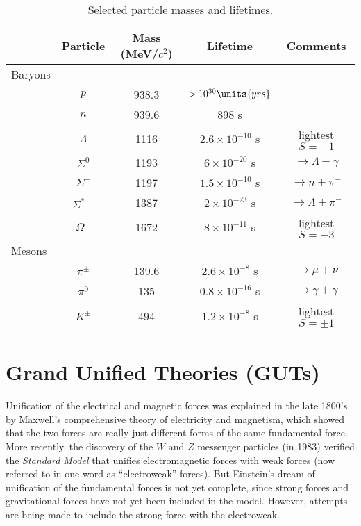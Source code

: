 \begin{table}[!b]
\caption{Selected particle masses and lifetimes.}
\label{table:mass_lifetimes}
\begin{center}
\begin{tabular}[tbp]{lcccc}
& Particle & Mass (MeV/$c^2$) & Lifetime & Comments \\
\hline\hline
Baryons & \\
& $p$ & 938.3 & $>10^{30}\units{yrs}$ & \\
& $n$ & 939.6 & 898 s & \\
& $\Lambda$ &  1116 & $2.6\times 10^{-10}$ s & lightest $S = -1$ \\
& $\Sigma^0$ & 1193 & $6\times 10^{-20}$ s & $\to \Lambda + \gamma$ \\
& $\Sigma^-$ & 1197 & $1.5\times 10^{-10}$ s & $\to n + \pi^-$ \\
& $\Sigma^{*-}$ & 1387 & $2\times 10^{-23}$ s & $\to \Lambda + \pi^-$ \\
& $\Omega^-$ & 1672 & $8\times 10^{-11}$ s & lightest $S = -3$\\
Mesons & \\
& $\pi^\pm$  & 139.6 & $2.6\times 10^{-8}$ s & $\to \mu + \nu$\\
& $\pi^0$    & 135   & $0.8\times 10^{-16}$ s & $\to\gamma + \gamma$\\
& $K^\pm$    & 494   & $1.2\times 10^{-8}$ s & lightest $S = \pm 1$\\
\hline
\end{tabular}
\end{center}
\end{table}

\section{Grand Unified Theories (GUTs)}
\label{sec:gut_theories}
Unification of the electrical and magnetic forces was explained in the
late 1800's by Maxwell's comprehensive theory of electricity and
magnetism, which showed that the two forces are really just different
forms of the same fundamental force.  More recently, the discovery of
the $W$ and $Z$ messenger particles (in 1983) verified the {\em Standard
Model} that unifies electromagnetic forces with weak forces (now
referred to in one word as ``electroweak'' forces).  But Einstein's
dream of unification of the fundamental forces is not yet complete,
since strong forces and gravitational forces have not yet been
included in the model.  However, attempts are being made to include
the strong force with the electroweak.

